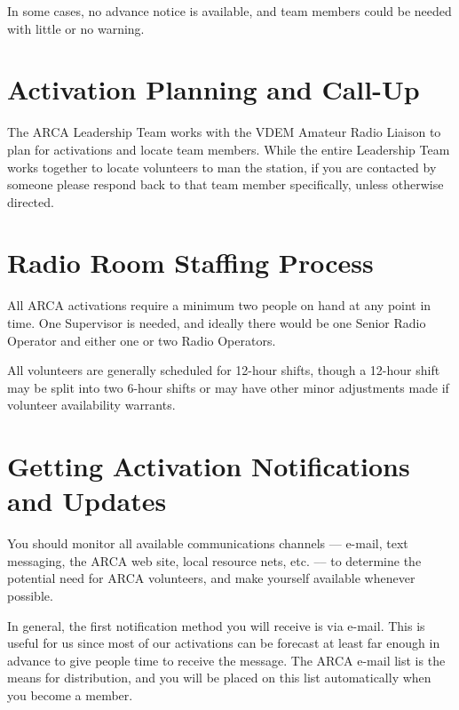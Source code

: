 \documentclass[pdflatex,letterpaper,twoside,12pt]{book}
\begin{document}
In some cases, no advance notice is available, and team members could be needed with little or no warning.


\section{Activation Planning and Call-Up}

The ARCA Leadership Team works with the VDEM Amateur Radio Liaison to plan for activations and locate team members.  While the entire Leadership Team works together to locate volunteers to man the station, if you are contacted by someone please respond back to that team member specifically, unless otherwise directed.


\section{Radio Room Staffing Process}

All ARCA activations require a minimum two people on hand at any point in time.  One Supervisor is needed, and ideally there would be one Senior Radio Operator and either one or two Radio Operators.

All volunteers are generally scheduled for 12-hour shifts, though a 12-hour shift may be split into two 6-hour shifts or may have other minor adjustments made if volunteer availability warrants.


\section{Getting Activation Notifications and Updates}

You should monitor all available communications channels --- e-mail, text messaging, the ARCA web site, local resource nets, etc. –-- to determine the potential need for ARCA volunteers, and make yourself available whenever possible.

In general, the first notification method you will receive is via e-mail.  This is useful for us since most of our activations can be forecast at least far enough in advance to give people time to receive the message.  The ARCA e-mail list is the means for distribution, and you will be placed on this list automatically when you become a member.
\end{document}

